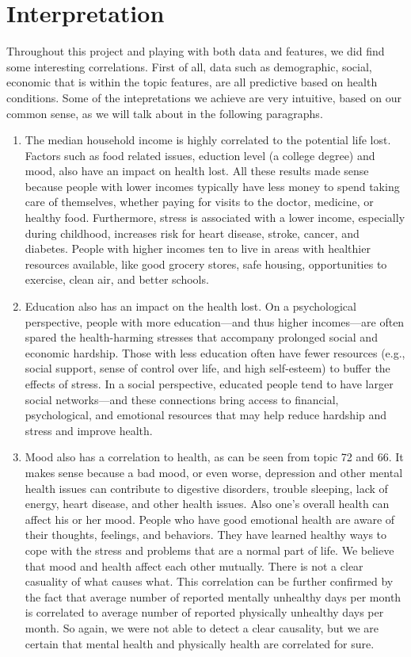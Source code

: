 \documentclass[english]{article}
\begin{document}
\section{Interpretation}
Throughout this project and playing with both data and features, we did find some interesting correlations. First of all, data such as demographic, social, economic that is within the topic features, are all predictive based on health conditions. Some of the intepretations we achieve are very intuitive, based on our common sense, as we will talk about in the following paragraphs.\\
\begin{enumerate}
\item The median household income is highly correlated to the potential life lost. Factors such as food related issues, eduction level (a college degree) and mood, also have an impact on health lost. All these results made sense because people with lower incomes typically have less money to spend taking care of themselves, whether paying for visits to the doctor, medicine, or healthy food. Furthermore, stress is associated with a lower income, especially during childhood, increases risk for heart disease, stroke, cancer, and diabetes. People with higher incomes ten to live in areas with healthier resources available, like good grocery stores, safe housing, opportunities to exercise, clean air, and better schools.\\
\item Education also has an impact on the health lost. On a psychological perspective, people with more education—and thus higher incomes—are often spared the health-harming stresses that accompany prolonged social and economic hardship. Those with less education often have fewer resources (e.g., social support, sense of control over life, and high self-esteem) to buffer the effects of stress. In a social perspective, educated people tend to have larger social networks—and these connections bring access to financial, psychological, and emotional resources that may help reduce hardship and stress and improve health.\\
\item Mood also has a correlation to health, as can be seen from topic 72 and 66. It makes sense because a bad mood, or even worse, depression and other mental health issues can contribute to digestive disorders, trouble sleeping, lack of energy, heart disease, and other health issues. Also one's overall health can affect his or her mood. People who have good emotional health are aware of their thoughts, feelings, and behaviors. They have learned healthy ways to cope with the stress and problems that are a normal part of life. We believe that mood and health affect each other mutually. There is not a clear casuality of what causes what. This correlation can be further confirmed by the fact that average number of reported mentally unhealthy days per month is correlated to average number of reported physically unhealthy days per month. So again, we were not able to detect a clear causality, but we are certain that mental health and physically health are correlated for sure.\\

\end{enumerate}
\end{document}
